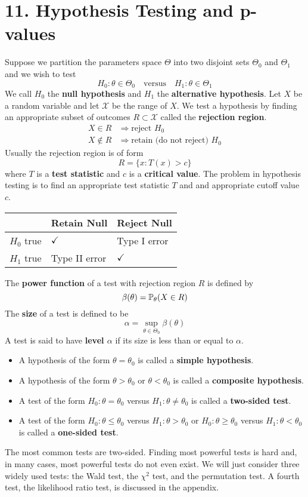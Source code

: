 \section*{11. Hypothesis Testing and p-values}\label{hypothesis-testing-and-p-values}
Suppose we partition the parameters space \(\Theta\) into two disjoint
sets \(\Theta_{0}\) and \(\Theta_{1}\) and we wish to test
\[
H_{0}: \theta \in \Theta_{0}
\quad \text{versus} \quad
H_{1}: \theta \in \Theta_{1}
\]
We call \(H_{0}\) the \textbf{null hypothesis} and \(H_{1}\) the
\textbf{alternative hypothesis}.
Let \(X\) be a random variable and let \(\mathcal{X}\) be the range of
\(X\). We test a hypothesis by finding an appropriate subset of outcomes
\(R \subset \mathcal{X}\) called the \textbf{rejection region}.
\begin{align*}
X \in R & \Longrightarrow  \text{reject } H_{0} \\
X \notin R & \Longrightarrow  \text{retain (do not reject) } H_{0}
\end{align*}
Usually the rejection region is of form
\[
R = \bigg\{x: T(x) > c \bigg\}
\]
where \(T\) is a \textbf{test statistic} and \(c\) is a \textbf{critical
value}. The problem in hypothesis testing is to find an appropriate test
statistic \(T\) and and appropriate cutoff value \(c\).
\begin{table}[H]
\centering
\begin{tabular}{@{}lll@{}}
\toprule
& Retain Null & Reject Null \\
\midrule
\(H_{0}\) true & \(\checkmark\) & Type I error 
\\
\(H_{1}\) true & Type II error & \(\checkmark\) 
\\
\bottomrule
\end{tabular}
\end{table}
The \textbf{power function} of a test with rejection region \(R\) is
defined by
\[
\beta(\theta) = \operatorname{\mathbb{P}}_\theta(X \in R)
\]
The \textbf{size} of a test is defined to be
\[
\alpha = \sup_{\theta \in \Theta_{0}} \beta(\theta)
\]
A test is said to have \textbf{level \(\alpha\)} if its size is less
than or equal to \(\alpha\).
\begin{itemize}[tightlist]
\item
  A hypothesis of the form \(\theta = \theta_{0}\) is called a
  \textbf{simple hypothesis}.
\item
  A hypothesis of the form \(\theta > \theta_{0}\) or
  \(\theta < \theta_{0}\) is called a \textbf{composite hypothesis}.
\item
  A test of the form \(H_{0} : \theta = \theta_{0}\) versus
  \(H_{1} : \theta \neq \theta_{0}\) is called a \textbf{two-sided test}.
\item
  A test of the form \(H_{0} : \theta \leq \theta_{0}\) versus
  \(H_{1}: \theta > \theta_{0}\) or \(H_{0}: \theta \geq \theta_{0}\) versus
  \(H_{1}: \theta < \theta_{0}\) is called a \textbf{one-sided test}.
\end{itemize}
The most common tests are two-sided.
Finding most powerful tests is hard and, in many cases, most powerful
tests do not even exist. We will just consider three widely used tests:
the Wald test, the \(\chi^{2}\) test, and the permutation test. A fourth
test, the likelihood ratio test, is discussed in the appendix.

